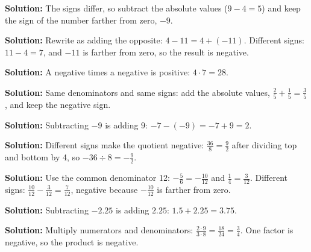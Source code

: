 \documentclass[12pt]{article}
\begin{document}



\textbf{Solution:} The signs differ, so subtract the absolute values ($9 - 4 = 5$) and
keep the sign of the number farther from zero, $-9$. 


\textbf{Solution:} Rewrite as adding the opposite: $4 - 11 = 4 + (-11)$. Different
signs: $11 - 4 = 7$, and $-11$ is farther from zero, so the result is negative. 


\textbf{Solution:} A negative times a negative is positive: $4 \cdot 7 = 28$. 


\textbf{Solution:} Same denominators and same signs: add the absolute values,
$\tfrac{2}{5} + \tfrac{1}{5} = \tfrac{3}{5}$, and keep the negative sign. 


\textbf{Solution:} Subtracting $-9$ is adding $9$: $-7 - (-9) = -7 + 9 = 2$. 


\textbf{Solution:} Different signs make the quotient negative:
$\tfrac{36}{8} = \tfrac{9}{2}$ after dividing top and bottom by 4, so
$-36 \div 8 = -\tfrac{9}{2}$. 


\textbf{Solution:} Use the common denominator 12: $-\tfrac{5}{6} = -\tfrac{10}{12}$ and
$\tfrac{1}{4} = \tfrac{3}{12}$. Different signs: $\tfrac{10}{12} - \tfrac{3}{12} = \tfrac{7}{12}$,
negative because $-\tfrac{10}{12}$ is farther from zero. 


\textbf{Solution:} Subtracting $-2.25$ is adding $2.25$: $1.5 + 2.25 = 3.75$. 


\textbf{Solution:} Multiply numerators and denominators:
$\tfrac{2 \cdot 9}{3 \cdot 8} = \tfrac{18}{24} = \tfrac{3}{4}$. One factor is negative,
so the product is negative. 
\end{document}
